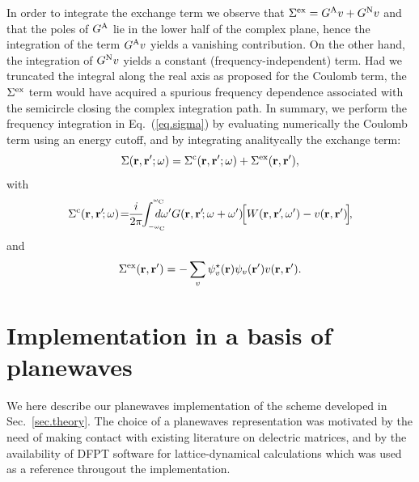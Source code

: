 \documentclass[twocolumn,prb,showpacs,superscriptaddress]{revtex4}
\def\w{\omega}
\def\wp{\omega^\prime}
\def\wc{{\omega_{\rm C}}}
\def\r{{\bf r}}
\def\rp{{\bf r^\prime}}
\begin{document}
In order to integrate the exchange term we observe that 
$\Sigma^{\rm ex}=G^{\rm A}v + G^{\rm N}v$
and that the poles of $G^{\rm A}$ lie in the lower half of the complex plane,
hence the integration of the term $G^{\rm A}v$ yields a vanishing contribution.
On the other hand, the integration of $G^{\rm N}v$ yields a constant (frequency-independent) term.
Had we truncated the integral along the real axis as proposed for the Coulomb term, 
the $\Sigma^{\rm ex}$ term would have acquired a spurious frequency dependence associated with
the semicircle closing the complex integration path.
In summary, we perform the frequency integration in Eq.\ (\ref{eq.sigma}) 
by evaluating numerically
the Coulomb term using an energy cutoff, and by integrating analitycally the exchange term:
  \begin{equation}
  \Sigma(\r,\rp;\w) = \Sigma^{\rm c}(\r,\rp;\w) + \Sigma^{\rm ex}(\r,\rp),
  \end{equation}
with
  \begin{equation}\label{eq.convolution}
 \Sigma^{\rm c}(\r,\rp\!;\w) \! = \!\! \frac{i}{2\pi} \!\!\int_{_{-\wc}}^{^\wc} \!\!\!\!\!\!\!d\wp 
 G(\r,\rp\!;\w+\wp) \!\Big[W(\r,\rp\!,\wp)-v(\r,\rp)\!\Big]\!,
  \end{equation}
and
  \begin{equation}
  \Sigma^{\rm ex}(\r,\rp) = - \sum_v \psi_v^\star(\r)\psi_v(\rp) v(\r,\rp).
  \end{equation}


\section{Implementation in a basis of planewaves}\label{sec.theory.g}

We here describe our planewaves implementation of the scheme 
developed in Sec.\ \ref{sec.theory}. The choice of a planewaves representation
was motivated by the need of making contact with existing literature on delectric
matrices,\cite{cpm,hl86-prb,balde_tosa,baroni-resta} 
and by the availability of DFPT software for lattice-dynamical
calculations\cite{espresso} which was used as a reference througout the implementation.
\end{document}
